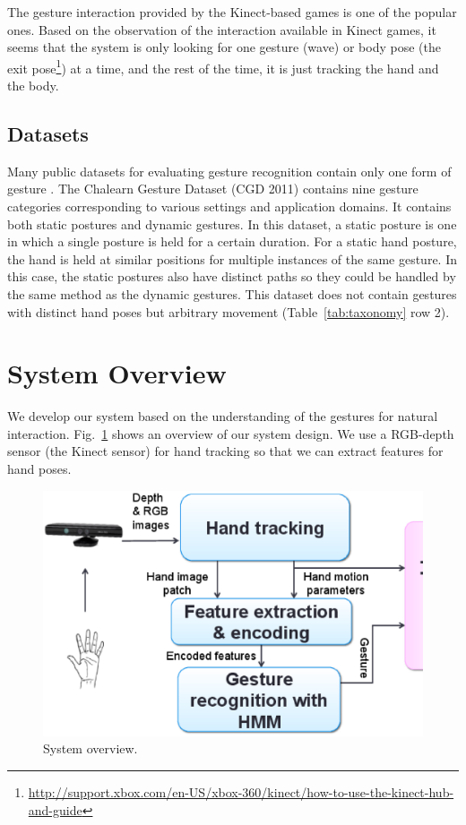 \documentclass[conference]{IEEEtran}
\begin{document}
The gesture interaction provided by the Kinect-based games is
one of the popular ones. Based on the observation of the interaction
available in Kinect games, it seems that the system is only looking for one
gesture (wave) or body pose (the exit
pose\footnote{\url{http://support.xbox.com/en-US/xbox-360/kinect/how-to-use-the-kinect-hub-and-guide}}) at a time, and the rest of the time, 
it is just tracking the hand and the body.

\subsection{Datasets}
Many public datasets for evaluating gesture recognition contain only one form
of gesture \cite{Song11, Ruffieux2013, marcel99}. The Chalearn Gesture Dataset (CGD
2011) \cite{guyon13} contains nine gesture categories corresponding to various settings and application domains.
 It contains both static postures and dynamic gestures. In this dataset, a static
posture is one in which a single posture is held for a certain duration. For a
static hand posture, the hand is held at similar positions for multiple
instances of the same gesture. In this case, the static postures also have
distinct paths so they could be handled by the same method as the dynamic
gestures.
This dataset does not contain gestures with distinct hand poses but arbitrary movement
(Table~\ref{tab:taxonomy} row 2).

\section{System Overview}
We develop our system based on the understanding of the gestures for
natural interaction. Fig.~\ref{fig:system} shows an overview of our system
design.
We use a RGB-depth sensor (the Kinect sensor) for hand tracking so that we can extract
features for hand poses.

\begin{figure}[!t]
\centering
\includegraphics[width=0.8\columnwidth]{fig/system_overview.ps}
\caption{System overview.}
\label{fig:system}
\end{figure}
\end{document}
